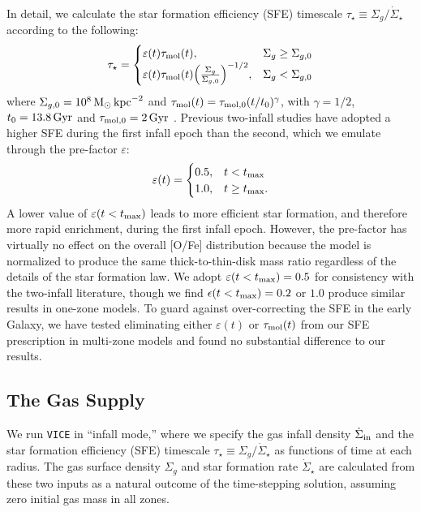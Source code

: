 \documentclass[twocolumn,twocolappendix,linenumbers]{aastex631}
\newcommand{\kpc}{\,{\rm kpc}}
\begin{document}
In detail, we calculate the star formation efficiency (SFE) timescale $\tau_\star\equiv\Sigma_g/\dot\Sigma_\star$ according to the following:
\begin{equation}
    \label{eq:sf-law}
    \tau_\star = 
    \begin{cases}
        \varepsilon(t) \tau_{\rm mol}(t),   & \Sigma_g \ge \Sigma_{g,0} \\
        \varepsilon(t) \tau_{\rm mol}(t) \Big(\frac{\Sigma_g}{\Sigma_{g,0}}\Big)^{-1/2}, & \Sigma_g < \Sigma_{g,0}
    \end{cases}
\end{equation}
where $\Sigma_{g,0} = 10^8\,{\rm M}_\odot\kpc^{-2}$ and $\tau_{\rm mol}(t)=\tau_{\rm mol,0}(t/t_0)^\gamma$, with $\gamma=1/2$, $t_0=13.8\,{\rm Gyr}$ and $\tau_{\rm mol,0}=2\,{\rm Gyr}$ \citep{leroy_star_2008}. Previous two-infall studies \citep[e.g.,][]{spitoni_galactic_2019,spitoni_galactic_2020,palla_chemical_2020} have adopted a higher SFE during the first infall epoch than the second, which we emulate through the pre-factor $\varepsilon$:
\begin{equation}
    \label{eq:sfe-prefactor}
    \varepsilon(t) = 
    \begin{cases}
        0.5, & t < t_{\rm max} \\
        1.0, & t \ge t_{\rm max}.
    \end{cases}
\end{equation}
A lower value of $\varepsilon(t<t_{\rm max})$ leads to more efficient star formation, and therefore more rapid enrichment, during the first infall epoch. However, the pre-factor has virtually no effect on the overall [O/Fe] distribution because the model is normalized to produce the same thick-to-thin-disk mass ratio regardless of the details of the star formation law. We adopt $\varepsilon(t<t_{\rm max})=0.5$ for consistency with the two-infall literature, though we find $\epsilon(t<t_{\rm max})=0.2$ or $1.0$ produce similar results in one-zone models. To guard against over-correcting the SFE in the early Galaxy, we have tested eliminating either $\varepsilon(t)$ or $\tau_{\rm mol}(t)$ from our SFE prescription in multi-zone models and found no substantial difference to our results.

\subsection{The Gas Supply}
\label{sec:sfh}

We run {\tt VICE} in ``infall mode,'' where we specify the gas infall density $\dot\Sigma_{\rm in}$ and the star formation efficiency (SFE) timescale $\tau_\star\equiv \Sigma_g / \dot\Sigma_\star$ as functions of time at each radius. The gas surface density $\Sigma_g$ and star formation rate $\dot\Sigma_\star$ are calculated from these two inputs as a natural outcome of the time-stepping solution, assuming zero initial gas mass in all zones.
\end{document}
